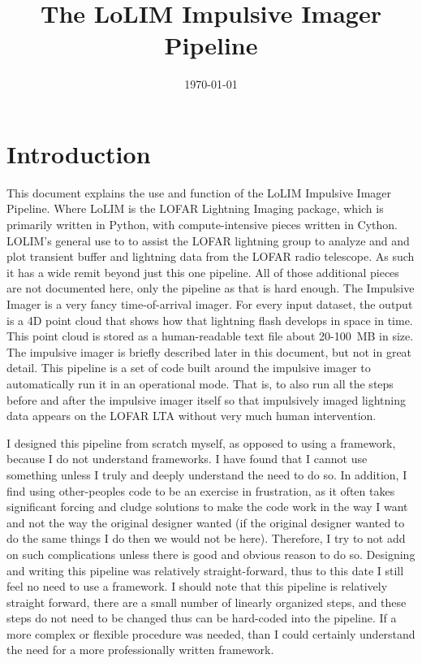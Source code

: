 \documentclass[]{article}
\begin{document}
\title{The LoLIM Impulsive Imager Pipeline}

\date{\today}


\maketitle

\section{Introduction}

This document explains the use and function of the LoLIM Impulsive Imager Pipeline. Where LoLIM is the LOFAR Lightning Imaging package, which is primarily written in Python, with compute-intensive pieces written in Cython. LOLIM's general use to to assist the LOFAR lightning group to analyze and and plot transient buffer and lightning data from the LOFAR radio telescope. As such it has a wide remit beyond just this one pipeline. All of those additional pieces are not documented here, only the pipeline as that is hard enough. The Impulsive Imager is a very fancy time-of-arrival imager. For every input dataset, the output is a 4D point cloud that shows how that lightning flash develops in space in time. This point cloud is stored as a human-readable text file about 20-100~MB in size. The impulsive imager is briefly described later in this document, but not in great detail. This pipeline is a set of code built around the impulsive imager to automatically run it in an operational mode. That is, to also run all the steps before and after the impulsive imager itself so that impulsively imaged lightning data appears on the LOFAR LTA without very much human intervention. 

I designed this pipeline from scratch myself, as opposed to using a framework, because I do not understand frameworks. I have found that I cannot use something unless I truly and deeply understand the need to do so. In addition, I find using other-peoples code to be an exercise in frustration, as it often takes significant forcing and cludge solutions to make the code work in the way I want and not the way the original designer wanted (if the original designer wanted to do the same things I do then we would not be here). Therefore, I try to not add on such complications unless there is good and obvious reason to do so. Designing and writing this pipeline was relatively straight-forward, thus to this date I still feel no need to use a framework. I should note that this pipeline is relatively straight forward, there are a small number of linearly organized steps, and these steps do not need to be changed thus can be hard-coded into the pipeline. If a more complex or flexible procedure was needed, than I could certainly understand the need for a more professionally written framework. 
\end{document}
